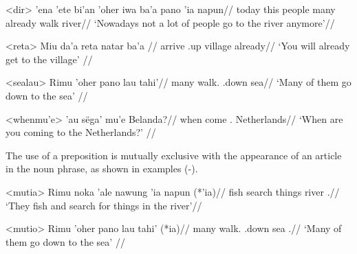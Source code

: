 \documentclass[../hewa_main-subfiles.tex]{subfiles}
\begin{document}
\a<dir> %
\begingl %
\gla 'ena 'ete bi'an 'oher iwa ba'a pano 'ia napun//
\glb today this people many \Neg{} already walk \Dir{} river//
\glft `Nowadays not a lot of people go to the river anymore'// 
\endgl
\xe

\ex<reta> %
\begingl %
\gla Miu da'a reta natar ba'a //
\glb \Second{}\Pl{} arrive \Dir{}.up village already//
\glft `You will already get to the village' // 
\endgl
\xe

\ex<sealau> %
\begingl %
\gla Rimu 'oher pano lau tahi'//
\glb \Third{}\Pl{} many walk.\Third{}\Pl{} \Dir{}.down sea//
\glft `Many of them go down to the sea' // 
\endgl
\xe

\ex<whenmu'e> %
\begingl %
 'au sëga' mu'e Belanda?//
\glb when \Second{}\Sg{} come \Dir{}.\Dei{} Netherlands//
\glft `When are you coming to the Netherlands?' // 
\endgl
\xe


The use of a preposition is mutually exclusive with the appearance of an article in the noun phrase, as shown in examples (-).

\ex<mutia> %
\begingl %
\gla Rimu noka 'ale nawung 'ia napun (*'ia)//
\glb \Third{}\Pl{} fish search things \Loc{} river \Def{}.\Sg{}//
\glft `They fish and search for things in the river'//
\endgl
\xe

\ex<mutio> %
\begingl %
\gla Rimu 'oher pano lau tahi' (*ia)//
\glb \Third{}\Pl{} many walk.\Third{}\Pl{} \Dir{}.down sea \Def{}.\Sg{}//
\glft `Many of them go down to the sea' // 
\endgl
\xe
\end{document}
